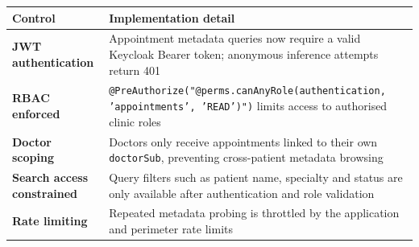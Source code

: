 \documentclass[12pt,a4paper]{report}
\begin{document}
\par\noindent\begin{minipage}{\linewidth}
\centering
\scriptsize
\renewcommand{\arraystretch}{0.88}
\begin{tabularx}{\linewidth}{>{\bfseries}p{4.6cm} X}
\toprule
\textbf{Control} & \textbf{Implementation detail} \\
\midrule
JWT authentication       & Appointment metadata queries now require a valid Keycloak Bearer token; anonymous inference attempts return 401 \\
RBAC enforced            & \texttt{@PreAuthorize("@perms.canAnyRole(authentication, 'appointments', 'READ')")} limits access to authorised clinic roles \\
Doctor scoping           & Doctors only receive appointments linked to their own \texttt{doctorSub}, preventing cross-patient metadata browsing \\
Search access constrained & Query filters such as patient name, specialty and status are only available after authentication and role validation \\
Rate limiting            & Repeated metadata probing is throttled by the application and perimeter rate limits \\
\bottomrule
\end{tabularx}
\end{minipage}
\par\medskip
\end{document}
